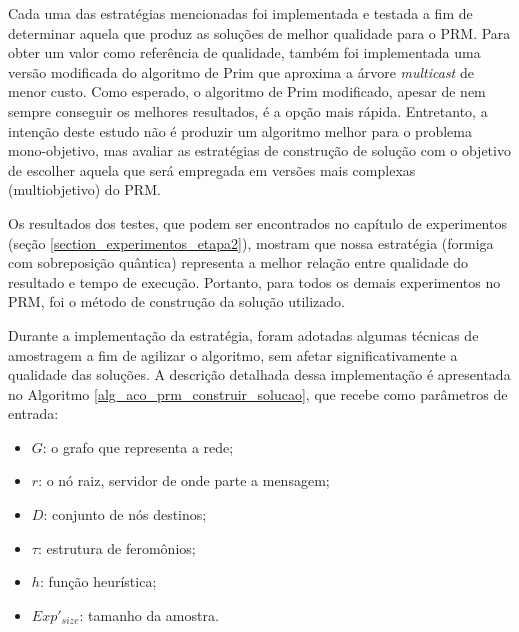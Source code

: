 Cada uma das estratégias mencionadas foi implementada e testada a fim de determinar aquela que produz as soluções de melhor qualidade para o PRM. Para obter um valor como referência de qualidade, também foi implementada uma versão modificada do algoritmo de Prim \cite{Prim1957} que aproxima a árvore \textit{multicast} de menor custo. Como esperado, o algoritmo de Prim modificado, apesar de nem sempre conseguir os melhores resultados, é a opção mais rápida. Entretanto, a intenção deste estudo não é produzir um algoritmo melhor para o problema mono-objetivo, mas avaliar as estratégias de construção de solução com o objetivo de escolher aquela que será empregada em versões mais complexas (multiobjetivo) do PRM.

Os resultados dos testes, que podem ser encontrados no capítulo de experimentos (seção \ref{section_experimentos_etapa2}), mostram que nossa estratégia (formiga com sobreposição quântica) representa a melhor relação entre qualidade do resultado e tempo de execução. Portanto, para todos os demais experimentos no PRM, foi o método de construção da solução utilizado.

Durante a implementação da estratégia, foram adotadas algumas técnicas de amostragem a fim de agilizar o algoritmo, sem afetar significativamente a qualidade das soluções. A descrição detalhada dessa implementação é apresentada no Algoritmo \ref{alg_aco_prm_construir_solucao}, que recebe como parâmetros de entrada:

\begin{itemize}
	\item $G$: o grafo que representa a rede;
	\item $r$: o nó raiz, servidor de onde parte a mensagem;
	\item $D$: conjunto de nós destinos;
	\item $\tau$: estrutura de feromônios;
	\item $h$: função heurística;
	\item $Exp'_{size}$: tamanho da amostra.
\end{itemize}

